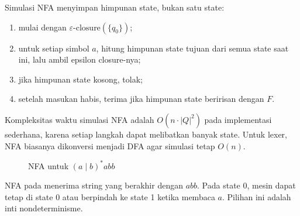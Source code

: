 Simulasi NFA menyimpan himpunan state, bukan satu state:
\begin{enumerate}[label=\arabic*.,leftmargin=*]
  \item mulai dengan \(\varepsilon\text{-closure}(\{q_0\})\);
  \item untuk setiap simbol \(a\), hitung himpunan state tujuan dari
        semua state saat ini, lalu ambil epsilon closure-nya;
  \item jika himpunan state kosong, tolak;
  \item setelah masukan habis, terima jika himpunan state beririsan
        dengan \(F\).
\end{enumerate}

Kompleksitas waktu simulasi NFA adalah \(O(n \cdot |Q|^2)\) pada
implementasi sederhana, karena setiap langkah dapat melibatkan
banyak state. Untuk lexer, NFA biasanya dikonversi menjadi DFA agar
simulasi tetap \(O(n)\).

\begin{figure}[H]
\centering
{}
\caption{NFA untuk \((a \mid b)^{*}abb\)}
\label{fig:ch06-nfa-abb}
\end{figure}

NFA pada  menerima string yang berakhir
dengan \(abb\). Pada state 0, mesin dapat tetap di state 0 atau
berpindah ke state 1 ketika membaca \(a\). Pilihan ini adalah inti
nondeterminisme.
